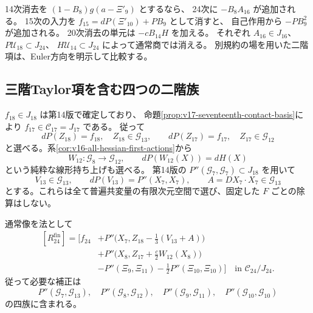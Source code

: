 \begin{remark}[単元を別に残す場合]
14次消去を $(1-B_8)g(a-\Xi'_9)$ とするなら、
24次に $-B_8A_{16}$ が追加される。
15次の入力を $f_{15}=dP(\Xi'_{10})+PB_9$ として消すと、
自己作用から $-PB_9^2$ が追加される。
20次消去の単元は $-cB_{14}H$ を加える。
それぞれ $A_{16}\in J_{16}$、$P\mathcal U_{18}\subset J_{24}$、
$H\mathcal U_{14}\subset J_{24}$ によって通常商では消える。
別規約の場を用いた二階項は、Euler方向を明示して比較する。
\end{remark}

\subsection{三階Taylor項を含む四つの二階族}

$f_{18}\in J_{18}$ は第14版で確定しており、
命題\ref{prop:v17-seventeenth-contact-basis}により
$f_{17}\in\mathcal C_{17}=J_{17}$ である。
従って
\[
 dP(Z_{18})=f_{18},\quad Z_{18}\in\mathcal G_{13},\qquad
 dP(Z_{17})=f_{17},\quad Z_{17}\in\mathcal G_{12}
\]
と選べる。系\ref{cor:v16-all-hessian-first-actions}から
\[
 W_{12}:\mathcal G_8\longrightarrow\mathcal G_{12},\qquad
                       dP(W_{12}(X))=dH(X)
\]
という純粋な線形持ち上げも選べる。
第14版の $P''(\mathcal G_7,\mathcal G_7)\subset J_{18}$ を用いて
\[
 V_{13}\in\mathcal G_{13},\qquad dP(V_{13})=P''(X_7,X_7),
 \qquad A=DX_7\cdot X_7\in\mathcal G_{13}
\]
とする。これらは全て普遍共変量の有限次元空間で選び、固定した $F$ ごとの除算はしない。

\begin{theorem}[二十四次の実際の類の四族代表]
\label{thm:v17-four-family-twenty-fourth-representative}
通常像を法として
\begin{equation}\label{eq:v17-four-family-twenty-fourth}
\begin{split}
 [R_{24}^{\mathrm{fin}}]=\bigl[f_{24}
 &+P''\bigl(X_7,Z_{18}-\tfrac13(V_{13}+A)\bigr)\\
 &+P''\bigl(X_8,Z_{17}+\tfrac c2W_{12}(X_8)\bigr)\\
 &-P''(\Xi_9,\Xi_{11})-\tfrac12P''(\Xi_{10},\Xi_{10})\bigr]
 \quad\text{in }\mathcal C_{24}/J_{24}.
\end{split}
\end{equation}
従って必要な補正は
\begin{equation}\label{eq:v17-four-pairing-families}
 P''(\mathcal G_7,\mathcal G_{13}),\quad
 P''(\mathcal G_8,\mathcal G_{12}),\quad
 P''(\mathcal G_9,\mathcal G_{11}),\quad
 P''(\mathcal G_{10},\mathcal G_{10})
\end{equation}
の四族に含まれる。
\end{theorem}

